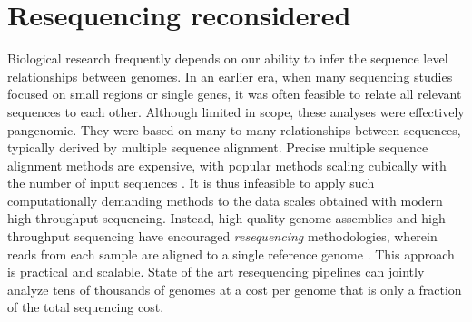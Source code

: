 



\section{Resequencing reconsidered}
\label{sec:resequencing}


Biological research frequently depends on our ability to infer the sequence level relationships between genomes.
In an earlier era, when many sequencing studies focused on small regions or single genes, it was often feasible to relate all relevant sequences to each other.
Although limited in scope, these analyses were effectively pangenomic.
They were based on many-to-many relationships between sequences, typically derived by multiple sequence alignment.
Precise multiple sequence alignment methods are expensive, with popular methods scaling cubically with the number of input sequences \cite{notredame2000t}.
It is thus infeasible to apply such computationally demanding methods to the data scales obtained with modern high-throughput sequencing. %
Instead, high-quality genome assemblies and high-throughput sequencing have encouraged \emph{resequencing} methodologies, wherein reads from each sample are aligned to a single reference genome \cite{stratton2008genome}.
This approach is practical and scalable.
State of the art resequencing pipelines can jointly analyze tens of thousands of genomes \cite{Poplin_2017} at a cost per genome that is only a fraction of the total sequencing cost.

